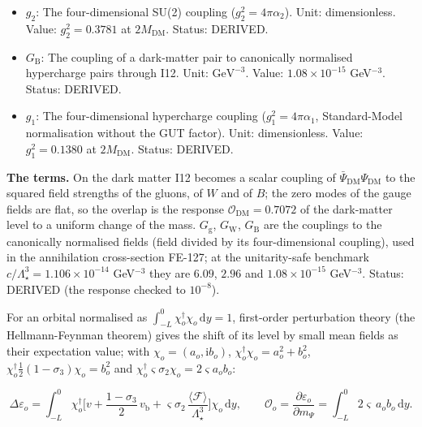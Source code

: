 \documentclass[
  10pt,
]{article}
\begin{document}
\begin{itemize}
  \(G_{\mathrm{W}}\): The coupling of a dark-matter pair to canonically
  normalised SU(2) gauge pairs through I12. Unit: \(\mathrm{GeV}^{-3}\).
  Value: \(2.96\times10^{-15}\) GeV\(^{-3}\). Status: DERIVED.
\item
  \(g_2\): The four-dimensional SU(2) coupling
  (\(g_2^2 = 4\pi\alpha_2\)). Unit: dimensionless. Value:
  \(g_2^2 = 0.3781\) at \(2M_{\mathrm{DM}}\). Status: DERIVED.
\item
  \(G_{\mathrm{B}}\): The coupling of a dark-matter pair to canonically
  normalised hypercharge pairs through I12. Unit: \(\mathrm{GeV}^{-3}\).
  Value: \(1.08\times10^{-15}\) GeV\(^{-3}\). Status: DERIVED.
\item
  \(g_1\): The four-dimensional hypercharge coupling
  (\(g_1^2 = 4\pi\alpha_1\), Standard-Model normalisation without the
  GUT factor). Unit: dimensionless. Value: \(g_1^2 = 0.1380\) at
  \(2M_{\mathrm{DM}}\). Status: DERIVED.
\end{itemize}

\textbf{The terms.} On the dark matter I12 becomes a scalar coupling of
\(\bar\Psi_{\mathrm{DM}}\Psi_{\mathrm{DM}}\) to the squared field
strengths of the gluons, of \(W\) and of \(B\); the zero modes of the
gauge fields are flat, so the overlap is the response
\(\mathcal{O}_{\mathrm{DM}} = 0.7072\) of the dark-matter level to a
uniform change of the mass. \(G_{\mathrm{g}}\), \(G_{\mathrm{W}}\),
\(G_{\mathrm{B}}\) are the couplings to the canonically normalised
fields (field divided by its four-dimensional coupling), used in the
annihilation cross-section FE-127; at the unitarity-safe benchmark
\(c/\Lambda_\star^3 = 1.106\times10^{-14}\) GeV\(^{-3}\) they are
\(6.09\), \(2.96\) and \(1.08\times10^{-15}\) GeV\(^{-3}\). Status:
DERIVED (the response checked to \(10^{-8}\)).

For an orbital normalised as
\(\int_{-L}^{0}\chi_o^\dagger\chi_o\,\mathrm{d}y = 1\), first-order
perturbation theory (the Hellmann-Feynman theorem) gives the shift of
its level by small mean fields as their expectation value; with
\(\chi_o = (a_o, \mathrm{i}b_o)\),
\(\chi_o^\dagger\chi_o = a_o^2 + b_o^2\),
\(\chi_o^\dagger\frac12(1 - \sigma_3)\chi_o = b_o^2\) and
\(\chi_o^\dagger\varsigma\sigma_2\chi_o = 2\varsigma a_ob_o\):

\[
\Delta\varepsilon_o = \int_{-L}^{0}\chi_o^\dagger\Big[v + \frac{1 - \sigma_3}{2}\,v_{\mathrm{b}} +
 \varsigma\sigma_2\,\frac{\langle\mathcal{F}\rangle}{\Lambda_\star^3}\Big]\chi_o\,\mathrm{d}y,\qquad
\mathcal{O}_o = \frac{\partial\varepsilon_o}{\partial m_\Psi} = \int_{-L}^{0}2\varsigma\,a_ob_o\,\mathrm{d}y.
\]
\end{document}

